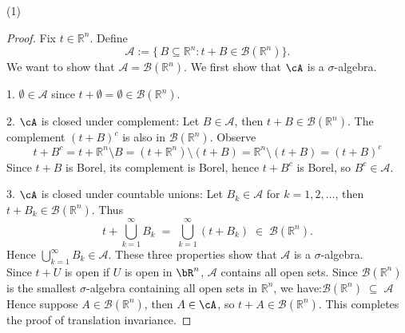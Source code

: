 \documentclass[lang=cn,11pt]{elegantbook}
\begin{document}
(1)
\begin{proof}

Fix \(t \in \mathbb{R}^n\). Define
\[
\mathcal{A} :=\{\, B \subseteq \mathbb{R}^n : t + B \in \mathcal{B}(\mathbb{R}^n) \}.
\]
We want to show that \(\mathcal{A} = \mathcal{B}(\mathbb{R}^n)\). We first show that $\cA$ is a $\sigma$-algebra.

1. \(\emptyset     \in  \mathcal{A}\) since \(t + \emptyset = \emptyset \in \mathcal{B}(\mathbb{R}^n)\).

2. $\cA$ is closed under complement: Let \(B \in \mathcal{A}\), then \(t + B \in \mathcal{B}(\mathbb{R}^n)\). The complement \((t + B)^c\) is also in \(\mathcal{B}(\mathbb{R}^n)\). Observe
\[
   t + B^c  = t + \mathbb{R}^n \setminus B = (t+\mathbb{R}^n) \setminus (t+B) = \mathbb{R}^n  \setminus (t+B) =  (t+B)^c
   \]
\noindent Since \(t + B\) is Borel, its complement is Borel, hence \(t + B^c\) is Borel, so \(B^c \in \mathcal{A}\).

3. $\cA$ is closed under countable unions: Let \(B_k \in \mathcal{A}\) for \(k = 1, 2, \dots\), then \(t + B_k \in \mathcal{B}(\mathbb{R}^n)\). Thus
   \[
   t + \bigcup_{k=1}^{\infty} B_k
   \;=\;
   \bigcup_{k=1}^{\infty} (t + B_k)
   \;\in\;
   \mathcal{B}(\mathbb{R}^n).
   \]
\noindent Hence \(\bigcup_{k=1}^{\infty} B_k \in \mathcal{A}\).
\noindent These three properties show that \(\mathcal{A}\) is a \(\sigma\)-algebra. \\

\noindent Since \(t + U\) is open if \(U\) is open in $\bR^n$, \(\mathcal{A}\) contains all open sets. Since \(\mathcal{B}(\mathbb{R}^n)\) is the smallest \(\sigma\)-algebra containing all open sets in \(\mathbb{R}^n\), we have:\(
\mathcal{B}(\mathbb{R}^n) \;\subseteq\; \mathcal{A}
\) 
\noindent Hence suppose \(A \in \mathcal{B}(\mathbb{R}^n) \), then $A \in \cA$, so $t+A \in   \mathcal{B}(\mathbb{R}^n)$. This completes the proof of translation invariance.
\end{proof}
\end{document}
